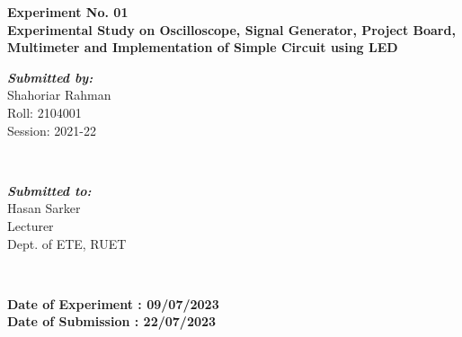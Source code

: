 \begin{titlepage}
\begin{center}
        \textbf{\Large  Experiment No. 01}
        \\[.25cm]
        \textbf{\large Experimental Study on Oscilloscope, Signal Generator, Project Board, Multimeter and Implementation of Simple Circuit using LED}
        \\
        \myrule[1pt][5pt]
        \begin{minipage}{0.4\textwidth}
            \vspace{0.5cm}
            \begin{flushleft}
                \emph{\textbf{\large Submitted by:}}
                \\
                Shahoriar Rahman \\
                Roll: 2104001 \\
                Session: 2021-22
            \end{flushleft}
        \end{minipage}
        ~
        \begin{minipage}{0.4\textwidth}
            \vspace{0.5cm}
            \begin{flushright}
                \emph{\textbf{\large Submitted to:}}
                \\
                Hasan Sarker
                \\
                Lecturer
                \\
                Dept. of ETE, RUET
                \\
            \end{flushright}
        \end{minipage}\\[0.7cm]
        \makeatother

        \textbf{Date of Experiment : 09/07/2023}\\
        \textbf{Date of Submission : 22/07/2023}\\[1cm]




\end{center}
\end{titlepage}
